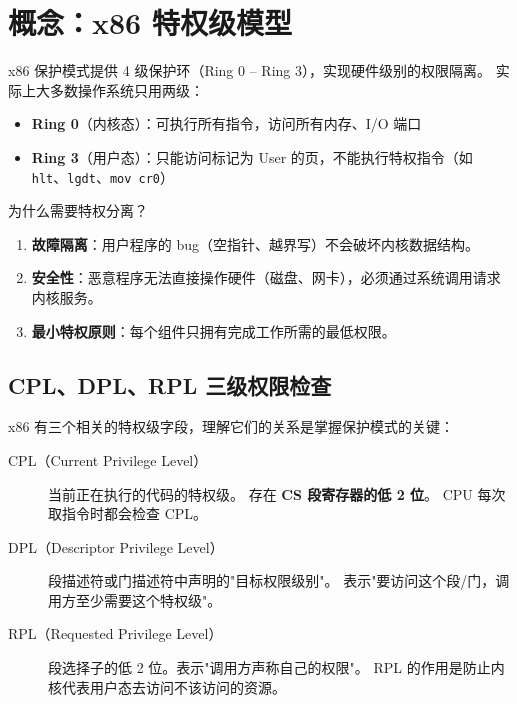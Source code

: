 \section{概念：x86 特权级模型}
\label{sec:tss-privilege}

x86 保护模式提供 4 级保护环（Ring 0 -- Ring 3），实现硬件级别的权限隔离。
实际上大多数操作系统只用两级：

\begin{itemize}
  \item \textbf{Ring 0}（内核态）：可执行所有指令，访问所有内存、I/O 端口
  \item \textbf{Ring 3}（用户态）：只能访问标记为 User 的页，不能执行特权指令（如 \texttt{hlt}、\texttt{lgdt}、\texttt{mov cr0}）
\end{itemize}

\begin{whybox}
为什么需要特权分离？
\begin{enumerate}
  \item \textbf{故障隔离}：用户程序的 bug（空指针、越界写）不会破坏内核数据结构。
  \item \textbf{安全性}：恶意程序无法直接操作硬件（磁盘、网卡），必须通过系统调用请求内核服务。
  \item \textbf{最小特权原则}：每个组件只拥有完成工作所需的最低权限。
\end{enumerate}
\end{whybox}



\subsection{CPL、DPL、RPL 三级权限检查}
\label{sec:tss-cpl-dpl-rpl}

x86 有三个相关的特权级字段，理解它们的关系是掌握保护模式的关键：

\begin{description}
  \item[CPL（Current Privilege Level）]
    当前正在执行的代码的特权级。
    存在 \textbf{CS 段寄存器的低 2 位}。
    CPU 每次取指令时都会检查 CPL。

  \item[DPL（Descriptor Privilege Level）]
    段描述符或门描述符中声明的"目标权限级别"。
    表示"要访问这个段/门，调用方至少需要这个特权级"。

  \item[RPL（Requested Privilege Level）]
    段选择子的低 2 位。表示"调用方声称自己的权限"。
    RPL 的作用是防止内核代表用户态去访问不该访问的资源。
\end{description}

